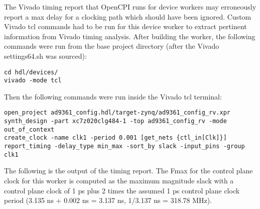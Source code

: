 \documentclass{article}
\begin{document}
The Vivado timing report that OpenCPI runs for device workers may erroneously report a max delay for a clocking path which should have been ignored. Custom Vivado tcl commands had to be run for this device worker to extract pertinent information from Vivado timing analysis. After building the worker, the following commands were run from the base project directory (after the Vivado settings64.sh was sourced):
\lstset{language=bash, columns=flexible, breaklines=true, prebreak=\textbackslash, basicstyle=\ttfamily, showstringspaces=false,upquote=true, aboveskip=\baselineskip, belowskip=\baselineskip}
\begin{lstlisting}
cd hdl/devices/
vivado -mode tcl
\end{lstlisting}
Then the following commands were run inside the Vivado tcl terminal:
\begin{lstlisting}
open_project ad9361_config.hdl/target-zynq/ad9361_config_rv.xpr
synth_design -part xc7z020clg484-1 -top ad9361_config_rv -mode out_of_context
create_clock -name clk1 -period 0.001 [get_nets {ctl_in[Clk]}]
report_timing -delay_type min_max -sort_by slack -input_pins -group clk1
\end{lstlisting}
The following is the output of the timing report. The Fmax for the control plane clock for this worker is computed as the maximum magnitude slack with a control plane clock of 1 ps plus 2 times the assumed 1 ps control plane clock period (3.135 ns + 0.002 ns = 3.137 ns, 1/3.137 ns = 318.78 MHz).
\fontsize{6}{12}\selectfont
\end{document}

